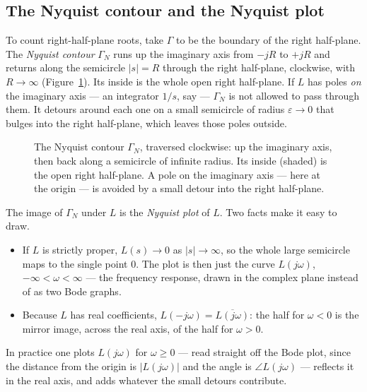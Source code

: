 \documentclass[11pt]{article}
\begin{document}
\subsection{The Nyquist contour and the Nyquist plot}
To count right-half-plane roots, take $\Gamma$ to be the boundary of the right
half-plane. The \emph{Nyquist contour} $\Gamma_N$ runs up the imaginary axis from
$-jR$ to $+jR$ and returns along the semicircle $|s|=R$ through the right
half-plane, clockwise, with $R\to\infty$ (Figure~\ref{fig:contour}). Its inside is
the whole open right half-plane. If $L$ has poles \emph{on} the imaginary axis ---
an integrator $1/s$, say --- $\Gamma_N$ is not allowed to pass through them. It
detours around each one on a small semicircle of radius $\varepsilon\to0$ that
bulges into the right half-plane, which leaves those poles outside.

\begin{figure}[htb]
\centering
{}
\caption{The Nyquist contour $\Gamma_N$, traversed clockwise: up the imaginary axis,
then back along a semicircle of infinite radius. Its inside (shaded) is the open
right half-plane. A pole on the imaginary axis --- here at the origin --- is
avoided by a small detour into the right half-plane.}
\label{fig:contour}
\end{figure}

The image of $\Gamma_N$ under $L$ is the \emph{Nyquist plot} of $L$. Two facts make
it easy to draw.
\begin{itemize}[leftmargin=*,itemsep=2pt]
\item If $L$ is strictly proper, $L(s)\to0$ as $|s|\to\infty$, so the whole large
semicircle maps to the single point $0$. The plot is then just the curve
$L(j\omega)$, $-\infty<\omega<\infty$ --- the frequency response, drawn in the
complex plane instead of as two Bode graphs.
\item Because $L$ has real coefficients, $L(-j\omega)=\overline{L(j\omega)}$: the
half for $\omega<0$ is the mirror image, across the real axis, of the half for
$\omega>0$.
\end{itemize}
In practice one plots $L(j\omega)$ for $\omega\ge0$ --- read straight off the Bode
plot, since the distance from the origin is $|L(j\omega)|$ and the angle is
$\angle L(j\omega)$ --- reflects it in the real axis, and adds whatever the small
detours contribute.
\end{document}
